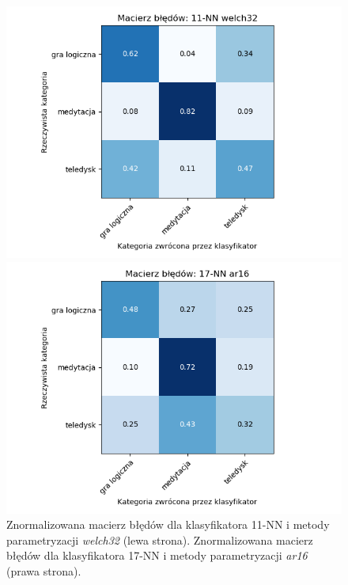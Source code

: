 \documentclass[notitlepage]{report}
\begin{document}
\begin{figure}[H]
	\begin{minipage}{0.48\textwidth}
		\centering
		\includegraphics[width=1.3\linewidth]{11nn_welch_32_cm.png}
	\end{minipage}
	\begin{minipage}{0.48\textwidth}
		\centering
		\includegraphics[width=1.3\linewidth]{17nn_ar_16_cm.png}
	\end{minipage}
	\caption{Znormalizowana macierz błędów dla klasyfikatora 11-NN i metody parametryzacji \textit{welch32} (lewa strona). Znormalizowana macierz błędów dla klasyfikatora 17-NN i metody parametryzacji \textit{ar16} (prawa strona).}
\end{figure}
\end{document}
